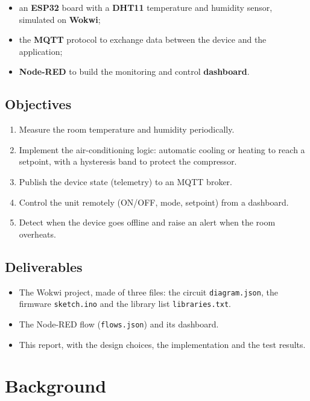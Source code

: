 \documentclass[11pt,a4paper]{article}
\begin{document}
\begin{itemize}
  \item an \textbf{ESP32} board with a \textbf{DHT11} temperature and humidity sensor,
        simulated on \textbf{Wokwi};
  \item the \textbf{MQTT} protocol to exchange data between the device and the application;
  \item \textbf{Node-RED} to build the monitoring and control \textbf{dashboard}.
\end{itemize}

\subsection{Objectives}
\begin{enumerate}
  \item Measure the room temperature and humidity periodically.
  \item Implement the air-conditioning logic: automatic cooling or heating to reach a
        setpoint, with a hysteresis band to protect the compressor.
  \item Publish the device state (telemetry) to an MQTT broker.
  \item Control the unit remotely (ON/OFF, mode, setpoint) from a dashboard.
  \item Detect when the device goes offline and raise an alert when the room overheats.
\end{enumerate}

\subsection{Deliverables}
\begin{itemize}
  \item The Wokwi project, made of three files: the circuit \texttt{diagram.json}, the
        firmware \texttt{sketch.ino} and the library list \texttt{libraries.txt}.
  \item The Node-RED flow (\texttt{flows.json}) and its dashboard.
  \item This report, with the design choices, the implementation and the test results.
\end{itemize}

\section{Background}
\end{document}
